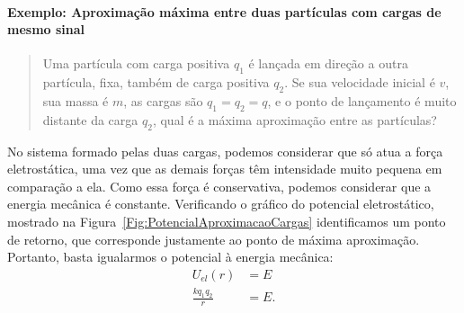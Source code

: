 \paragraph{Exemplo: Aproximação máxima entre duas partículas com cargas de mesmo sinal}

\begin{quote}
    Uma partícula com carga positiva $q_1$ é lançada em direção a outra partícula, fixa, também de carga positiva $q_2$. Se sua velocidade inicial é $v$, sua massa é $m$, as cargas são $q_1 = q_2 = q$, e o ponto de lançamento é muito distante da carga $q_2$, qual é a máxima aproximação entre as partículas?
\end{quote}

No sistema formado pelas duas cargas, podemos considerar que só atua a força eletrostática, uma vez que as demais forças têm intensidade muito pequena em comparação a ela. Como essa força é conservativa, podemos considerar que a energia mecânica é constante. Verificando o gráfico do potencial eletrostático, mostrado na Figura~\ref{Fig:PotencialAproximacaoCargas} identificamos um ponto de retorno, que corresponde justamente ao ponto de máxima aproximação. Portanto, basta igualarmos o potencial à energia mecânica:
\begin{align}
    U_{el}(r) &= E \\
    \frac{kq_1q_2}{r} &= E.
\end{align}

